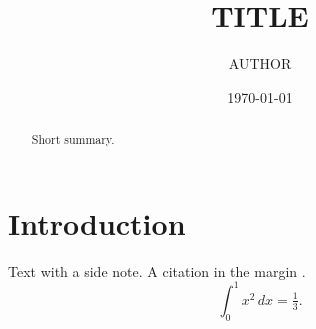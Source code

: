 \documentclass{tufte-handout}
\title{{{TITLE}}}
\author{{{AUTHOR}}}
\date{\today}
\begin{document}
\maketitle
\begin{abstract}
Short summary.
\end{abstract}
\section{Introduction}
Text with a side note.
A citation in the margin \cite{example2024}.
\[ \int_0^1 x^2\,dx=\tfrac13. \]


\end{document}
